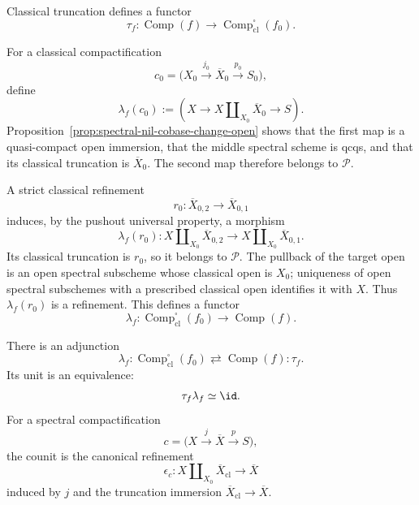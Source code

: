\begin{construction}
\label{constr:compactification-lifting-adjunction}
Classical truncation defines a functor
\[
    \tau_f:
    \operatorname{Comp}(f)
    \longrightarrow
    \operatorname{Comp}^{\square}_{\mathrm{cl}}(f_0).
\]

For a classical compactification
\[
    c_0=
    \bigl(
      X_0\xrightarrow{j_0}\overline X_0\xrightarrow{p_0}S_0
    \bigr),
\]
define
\[
    \lambda_f(c_0)
    :=
    \left(
      X
      \longrightarrow
      X\amalg_{X_0}\overline X_0
      \longrightarrow
      S
    \right).
\]
Proposition~\ref{prop:spectral-nil-cobase-change-open} shows that the first
map is a quasi-compact open immersion, that the middle spectral scheme is
qcqs, and that its classical truncation is \(\overline X_0\).  The second
map therefore belongs to \(\mathcal P\).

A strict classical refinement
\[
    r_0:\overline X_{0,2}\longrightarrow\overline X_{0,1}
\]
induces, by the pushout universal property, a morphism
\[
    \lambda_f(r_0):
    X\amalg_{X_0}\overline X_{0,2}
    \longrightarrow
    X\amalg_{X_0}\overline X_{0,1}.
\]
Its classical truncation is \(r_0\), so it belongs to \(\mathcal P\).  The
pullback of the target open is an open spectral subscheme whose classical
open is \(X_0\); uniqueness of open spectral subschemes with a prescribed
classical open identifies it with \(X\).  Thus \(\lambda_f(r_0)\) is a
refinement.  This defines a functor
\[
    \lambda_f:
    \operatorname{Comp}^{\square}_{\mathrm{cl}}(f_0)
    \longrightarrow
    \operatorname{Comp}(f).
\]
\end{construction}

\begin{proposition}
\label{prop:compactification-lifting-adjunction}
There is an adjunction
\[
    \lambda_f:
    \operatorname{Comp}^{\square}_{\mathrm{cl}}(f_0)
    \rightleftarrows
    \operatorname{Comp}(f):
    \tau_f.
\]
Its unit is an equivalence:
\[
    \tau_f\lambda_f
    \simeq
    \id.
\]
For a spectral compactification
\[
    c=
    \bigl(
      X\xrightarrow{j}\overline X\xrightarrow{p}S
    \bigr),
\]
the counit is the canonical refinement
\[
    \epsilon_c:
    X\amalg_{X_0}\overline X_{\mathrm{cl}}
    \longrightarrow
    \overline X
\]
induced by \(j\) and the truncation immersion
\(\overline X_{\mathrm{cl}}\to\overline X\).
\end{proposition}

